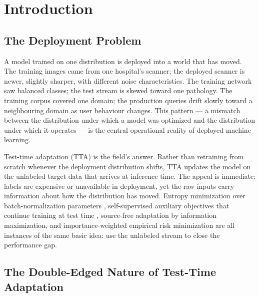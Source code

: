 
\chapter{Introduction}\label{ch:intro}

\section{The Deployment Problem}\label{sec:intro-deploy}

A model trained on one distribution is deployed into a world that has moved.
The training images came from one hospital's scanner; the deployed scanner is
newer, slightly sharper, with different noise characteristics.
The training network saw balanced classes; the test stream is skewed toward
one pathology.
The training corpus covered one domain; the production queries drift slowly
toward a neighbouring domain as user behaviour changes.
This pattern --- a mismatch between the distribution under which a model was
optimized and the distribution under which it operates --- is the central
operational reality of deployed machine learning.

Test-time adaptation (TTA) is the field's answer.
Rather than retraining from scratch whenever the deployment distribution
shifts, TTA updates the model on the unlabeled target data that arrives at
inference time.
The appeal is immediate: labels are expensive or unavailable in deployment,
yet the raw inputs carry information about how the distribution has moved.
Entropy minimization over batch-normalization parameters
\cite{wang2021tent}, self-supervised auxiliary objectives that continue
training at test time \cite{sun2020ttt}, source-free adaptation by
information maximization, and importance-weighted empirical risk
minimization \cite{shimodaira2000improving} are all instances of the same
basic idea: use the unlabeled stream to close the performance gap.

\section{The Double-Edged Nature of Test-Time Adaptation}\label{sec:intro-doubleedge}

